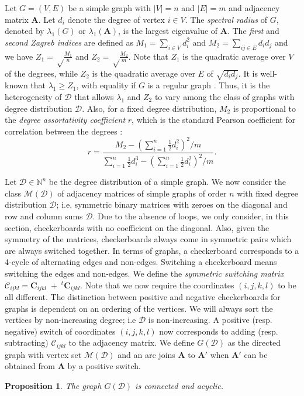 \documentclass{article}
\newtheorem{prop}{Proposition}
\newcommand{\N}{\mathbb{N}}
\newcommand{\D}{\mathcal D}
\newcommand{\MM}{\mathcal M}
\renewcommand{\ll}{\lambda_1}
\newcommand{\CC}{\mathcal C}
\newcommand{\A}{\mathbf A}
\newcommand{\C}{\mathbf C}
\begin{document}
Let $G=(V,E)$ be a simple graph with $|V|=n$ and $|E|=m$ and adjacency matrix $\A$. Let $d_i$ denote the degree of vertex $i\in V$. The \emph{spectral radius} of $G$, denoted by $\ll(G)$ or $\ll(\A)$, is the largest eigenvalue of $\A$. The \emph{first} and \emph{second Zagreb indices} are defined as $M_1=\sum_{i\in V} d_i^2$ and $M_2=\sum_{ij\in E}d_id_j$ and we have $Z_1=\sqrt\frac{M_1}n$ and $Z_2=\sqrt\frac{M_2}m$. Note that $Z_1$ is the quadratic average over $V$ of the degrees, while $Z_2$ is the quadratic average over $E$ of $\sqrt{d_id_j}$. It is well-known that $\ll\geq Z_1$, with equality if $G$ is a regular graph \cite{elphick2015relations}. Thus, it is the heterogeneity of $\D$ that allows $\ll$ and $Z_2$ to vary among the class of graphs with degree distribution $\D$. Also, for a fixed degree distribution, $M_2$ is proportional to the \emph{degree assortativity coefficient} $r$,  which is the standard Pearson coefficient for correlation between the degrees \cite{Li2005supplemental}:
$$r=\frac{M_2-(\sum_{i=1}^n\frac 12d_i^2)^2/m}{\sum_{i=1}^n\frac 12 d_i^3-(\sum_{i=1}^n\frac 12d_i^2)^2/m}.$$




Let $\D\in \N^n$ be the degree distribution of a simple graph. We now consider the class $\MM(\D)$ of adjacency matrices of simple graphs of order $n$ with fixed degree distribution $\D$; i.e. symmetric binary matrices with zeroes on the diagonal and row and column sums $\D$. Due to the absence of loops, we only consider, in this section, checkerboards with no coefficient on the diagonal. Also, given the symmetry of the matrices, checkerboards always come in symmetric pairs which are always switched together. In terms of graphs, a checkerboard corresponds to a 4-cycle of alternating edges and non-edges. Switching a checkerboard means switching the edges and non-edges. We define the \emph{symmetric switching matrix} $\CC_{ijkl}=\C_{ijkl}\;+\;^t\C_{ijkl}$. Note that we now require the coordinates $(i,j,k,l)$ to be all different. The distinction between positive and negative checkerboards for graphs is dependent on an ordering of the vertices. We will always sort the vertices by non-increasing degree; i.e $\D$ is non-increasing. A positive (resp. negative) switch of coordinates $(i,j,k,l)$ now corresponds to adding (resp. subtracting) $\CC_{ijkl}$ to the adjacency matrix. We define $G(\D)$ as the directed graph with vertex set $\MM(\D)$ and an arc joins $\A$ to $\A'$ when $\A'$ can be obtained from $\A$ by a positive switch.

\begin{prop}
The graph $G(\D)$ is connected and acyclic.
\end{prop}
\end{document}
